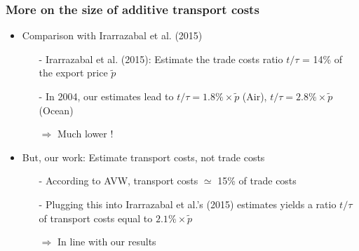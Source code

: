 \documentclass[10 pt,Helvetica, french]{beamer}
\begin{document}
\begin{frame}[label = app_comparison]
\frametitle{More on the size of additive transport costs}
\begin{itemize}
\item Comparison with Irarrazabal et al. (2015) \vspace{0.1cm}
\begin{itemize}
\item[-] Irarrazabal et al. (2015): Estimate the trade costs ratio $t/\tau$ = 14\% of the export price $\widetilde{p}$ \vspace{0.1cm}
\item[-] In 2004, our estimates lead to $t/\tau = 1.8\% \times \widetilde{p}$ (Air), $t/\tau = 2.8\%\times \widetilde{p}$ (Ocean) \vspace{0.1cm}
\item[$\Rightarrow$] Much lower !
\end{itemize}
\item But, our work: Estimate transport costs, not trade costs \vspace{0.1cm}
\begin{itemize}
\item[-] According to AVW, transport costs $\simeq$ 15\% of trade costs \vspace{0.1cm}
\item[-] Plugging this into Irarrazabal et al.'s (2015) estimates yields a ratio $t/\tau$ of transport costs equal to $2.1\% \times \widetilde{p}$
\item[$\Rightarrow$] In line with our results\vspace{0.1cm}
\end{itemize}
\end{itemize}
\hyperlink{slide_result1}{}
\end{frame}
\end{document}
